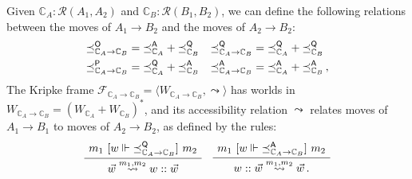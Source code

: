 \begin{definition} %
Given
$\mathbb{C}_A : \mathcal{R}(A_1, A_2)$ and
$\mathbb{C}_B : \mathcal{R}(B_1, B_2)$,
we can define the following relations
between the moves of $A_1 \rightarrow B_2$
and the moves of $A_2 \rightarrow B_2$:
\begin{align*}
  {\preceq}_{\mathbb{C}_A \rightarrow \mathbb{C}_B}^{ \mathsf{O} } &=
    {\preceq}_{\mathbb{C}_A}^{ \mathsf{A} } +
    {\preceq}_{\mathbb{C}_B}^{ \mathsf{Q} } &
  {\preceq}_{\mathbb{C}_A \rightarrow \mathbb{C}_B}^{ \mathsf{Q} } &=
    {\preceq}_{\mathbb{C}_A}^{ \mathsf{Q} } +
    {\preceq}_{\mathbb{C}_B}^{ \mathsf{Q} } \\
  {\preceq}_{\mathbb{C}_A \rightarrow \mathbb{C}_B}^{ \mathsf{P} } &=
    {\preceq}_{\mathbb{C}_A}^{ \mathsf{Q} } +
    {\preceq}_{\mathbb{C}_B}^{ \mathsf{A} } &
  {\preceq}_{\mathbb{C}_A \rightarrow \mathbb{C}_B}^{ \mathsf{A} } &=
    {\preceq}_{\mathbb{C}_A}^{ \mathsf{A} } +
    {\preceq}_{\mathbb{C}_B}^{ \mathsf{A} } \,,
\end{align*}
The Kripke frame
$\mathcal{F}_{\mathbb{C}_A \rightarrow \mathbb{C}_B} =
 \langle W_{\mathbb{C}_A \rightarrow \mathbb{C}_B}, \leadsto \rangle$
has worlds in
$W_{\mathbb{C}_A \rightarrow \mathbb{C}_B} =
 (W_{\mathbb{C}_A} + W_{\mathbb{C}_B})^*$,
and its accessibility relation $\leadsto$
relates moves of $A_1 \rightarrow B_1$
to moves of $A_2 \rightarrow B_2$,
as defined by the rules:
\[
    \AxiomC{$m_1 \ifr{w \Vdash {\preceq}_{\mathbb{C}_A \rightarrow \mathbb{C}_B}^\kw{Q}} m_2$}
    \UnaryInfC{$\vec{w} \stackrel{m_1, m_2}{\leadsto} w :: \vec{w}$}
    \DisplayProof
    \quad
    \AxiomC{$m_1 \ifr{w \Vdash {\preceq}^\kw{A}_{\mathbb{C}_A \rightarrow \mathbb{C}_B}} m_2$}
    \UnaryInfC{$w :: \vec{w} \stackrel{m_1, m_2}{\leadsto} \vec{w} \,.$}
    \DisplayProof
\]
\end{definition}

